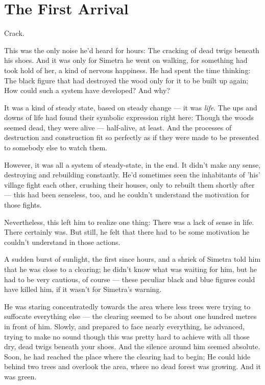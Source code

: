 \chapter{The First Arrival}
\label{cha:first-arrival}
Crack. 

This was the only noise he'd heard for hours: The cracking of dead twigs beneath his shoes. And it was only for Simetra he went on walking, for something had took hold of her, a kind of nervous happiness. 
He had spent the time thinking: The black figure that had destroyed the wood only for it to be built up again; How could such a system have developed? And why?

It was a kind of steady state, based on steady change --- it was \emph{life}. The ups and downs of life had found their symbolic expression right here: Though the woods seemed dead, they were alive --- half-alive, at least. And the processes of destruction and construction fit so perfectly as if they were made to be presented to somebody else to watch them.

However, it was all a system of steady-state, in the end. It didn't make any sense, destroying and rebuilding constantly. He'd sometimes seen the inhabitants of 'his' village fight each other, crushing their houses, only to rebuilt them shortly after --- this had been senseless, too, and he couldn't understand the motivation for those fights.

Nevertheless, this left him to realize one thing: There was a lack of sense in life. 
There certainly was. 
But still, he felt that there had to be some motivation he couldn't understand in those actions. 

A sudden burst of sunlight, the first since hours, and a shriek of Simetra told him that he was close to a clearing; he didn't know what was waiting for him, but he had to be very cautious, of course --- these peculiar black and blue figures could have killed him, if it wasn't for Simetra's warning. 

He was staring concentratedly towards the area where less trees were trying to suffocate everything else --- the clearing seemed to be about one hundred metres in front of him. 
Slowly, and prepared to face nearly everything, he advanced, trying to make no sound though this was pretty hard to achieve with all those dry, dead twigs beneath your shoes. And the silence around him seemed absolute. 
Soon, he had reached the place where the clearing had to begin; He could hide behind two trees and overlook the area, where no dead forest was growing. And it was green.

